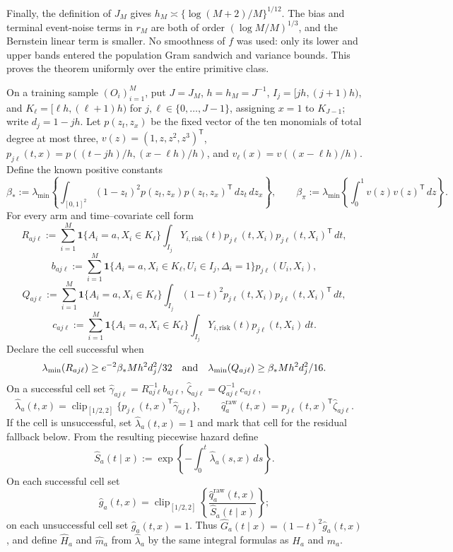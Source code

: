 Finally, the definition of \(J_M\) gives \(h_M\asymp\{\log(M+2)/M\}^{1/12}\).  The bias and terminal event-noise terms in \(r_M\) are both of order \((\log M/M)^{1/3}\), and the Bernstein linear term is smaller.  No smoothness of \(f\) was used: only its lower and upper bands entered the population Gram sandwich and variance bounds.  This proves the theorem uniformly over the entire primitive class.

On a training sample \((O_i)_{i=1}^M\), put \(J=J_M\), \(h=h_M=J^{-1}\), \(I_j=[jh,(j+1)h)\), and \(K_\ell=[\ell h,(\ell+1)h)\) for \(j,\ell\in\{0,\ldots,J-1\}\), assigning \(x=1\) to \(K_{J-1}\); write \(d_j=1-jh\).  Let \(p(z_t,z_x)\) be the fixed vector of the ten monomials of total degree at most three, \(v(z)=(1,z,z^2,z^3)^{\mathsf T}\), \(p_{j\ell}(t,x)=p((t-jh)/h,(x-\ell h)/h)\), and \(v_\ell(x)=v((x-\ell h)/h)\).  Define the known positive constants
\[
 \beta_*:=\lambda_{\min}\!\left\{\int_{[0,1]^2}(1-z_t)^2p(z_t,z_x)p(z_t,z_x)^{\mathsf T}\,dz_t\,dz_x\right\},
 \qquad
 \beta_\pi:=\lambda_{\min}\!\left\{\int_0^1v(z)v(z)^{\mathsf T}\,dz\right\}.
\]
For every arm and time--covariate cell form
\[
 R_{aj\ell}:=\sum_{i=1}^M\mathbf 1\{A_i=a,X_i\in K_\ell\}
 \int_{I_j}Y_{i,\mathrm{risk}}(t)p_{j\ell}(t,X_i)p_{j\ell}(t,X_i)^{\mathsf T}\,dt,
\]
\[
 b_{aj\ell}:=\sum_{i=1}^M\mathbf 1\{A_i=a,X_i\in K_\ell,U_i\in I_j,\Delta_i=1\}p_{j\ell}(U_i,X_i),
\]
\[
 Q_{aj\ell}:=\sum_{i=1}^M\mathbf 1\{A_i=a,X_i\in K_\ell\}
 \int_{I_j}(1-t)^2p_{j\ell}(t,X_i)p_{j\ell}(t,X_i)^{\mathsf T}\,dt,
\]
\[
 c_{aj\ell}:=\sum_{i=1}^M\mathbf 1\{A_i=a,X_i\in K_\ell\}
 \int_{I_j}Y_{i,\mathrm{risk}}(t)p_{j\ell}(t,X_i)\,dt.
\]
Declare the cell successful when
\[
 \lambda_{\min}(R_{aj\ell})\ge e^{-2}\beta_*Mh^2d_j^2/32
 \quad\hbox{and}\quad
 \lambda_{\min}(Q_{aj\ell})\ge\beta_*Mh^2d_j^2/16.
\]
On a successful cell set \(\widehat\gamma_{aj\ell}=R_{aj\ell}^{-1}b_{aj\ell}\), \(\widehat\zeta_{aj\ell}=Q_{aj\ell}^{-1}c_{aj\ell}\),
\[
 \widehat\lambda_a(t,x)=\operatorname{clip}_{[1/2,2]}\{p_{j\ell}(t,x)^{\mathsf T}\widehat\gamma_{aj\ell}\},
 \qquad
 \widehat q_a^{\mathrm{raw}}(t,x)=p_{j\ell}(t,x)^{\mathsf T}\widehat\zeta_{aj\ell}.
\]
If the cell is unsuccessful, set \(\widehat\lambda_a(t,x)=1\) and mark that cell for the residual fallback below.  From the resulting piecewise hazard define
\[
 \widehat S_a(t\mid x):=\exp\!\left\{-\int_0^t\widehat\lambda_a(s,x)\,ds\right\}.
\]
On each successful cell set
\[
 \widehat g_a(t,x)=\operatorname{clip}_{[1/2,2]}\left\{\frac{\widehat q_a^{\mathrm{raw}}(t,x)}{\widehat S_a(t\mid x)}\right\};
\]
on each unsuccessful cell set \(\widehat g_a(t,x)=1\).  Thus \(\widehat G_a(t\mid x)=(1-t)^2\widehat g_a(t,x)\), and define \(\widehat H_a\) and \(\widehat m_a\) from \(\widehat\lambda_a\) by the same integral formulas as \(H_a\) and \(m_a\).

